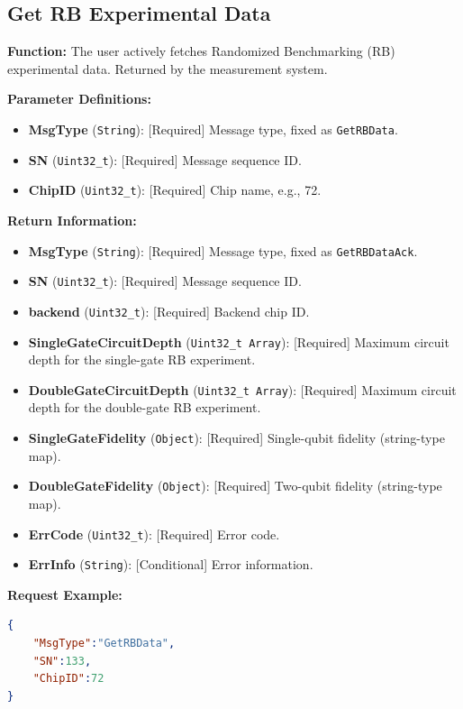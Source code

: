 \documentclass[12pt, a4paper]{article}
\begin{document}
\subsection{Get RB Experimental Data}

\textbf{Function:} The user actively fetches Randomized Benchmarking (RB) experimental data. Returned by the measurement system.

\textbf{Parameter Definitions:}
\begin{itemize}
    \item \textbf{MsgType} (\texttt{String}): [Required] Message type, fixed as \texttt{GetRBData}.
    \item \textbf{SN} (\texttt{Uint32\_t}): [Required] Message sequence ID.
    \item \textbf{ChipID} (\texttt{Uint32\_t}): [Required] Chip name, e.g., 72.
\end{itemize}

\textbf{Return Information:}
\begin{itemize}
    \item \textbf{MsgType} (\texttt{String}): [Required] Message type, fixed as \texttt{GetRBDataAck}.
    \item \textbf{SN} (\texttt{Uint32\_t}): [Required] Message sequence ID.
    \item \textbf{backend} (\texttt{Uint32\_t}): [Required] Backend chip ID.
    \item \textbf{SingleGateCircuitDepth} (\texttt{Uint32\_t Array}): [Required] Maximum circuit depth for the single-gate RB experiment.
    \item \textbf{DoubleGateCircuitDepth} (\texttt{Uint32\_t Array}): [Required] Maximum circuit depth for the double-gate RB experiment.
    \item \textbf{SingleGateFidelity} (\texttt{Object}): [Required] Single-qubit fidelity (string-type map).
    \item \textbf{DoubleGateFidelity} (\texttt{Object}): [Required] Two-qubit fidelity (string-type map).
    \item \textbf{ErrCode} (\texttt{Uint32\_t}): [Required] Error code.
    \item \textbf{ErrInfo} (\texttt{String}): [Conditional] Error information.
\end{itemize}

\noindent \textbf{Request Example:}
\begin{lstlisting}[language=json]
{
    "MsgType":"GetRBData",
    "SN":133,
    "ChipID":72
}
\end{lstlisting}
\end{document}
